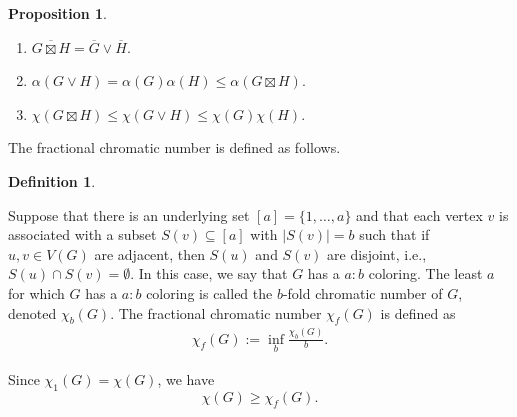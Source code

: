\documentclass[journal, onecolumn, draftcls]{IEEEtran}
\theoremstyle{definition}
\newtheorem{proposition}{Proposition}
\newtheorem{definition}{Definition}
\newcommand{\aditya}[1]{\marginpar{+}{\bf Aditya's remark}: {\em #1}}
\begin{document}
\begin{proposition}\label{prop:chi}
\begin{enumerate} [label=(\alph*)]
    \item $\overline{G\boxtimes H} = \overline{G}\lor \overline{H}$.\label{prop:de_morgan}
    \item $\alpha(G\lor H)=\alpha(G)\alpha(H) \le \alpha(G\boxtimes H)$. \label{prop:alpha_AND_OR_product}
    \item $\chi(G\boxtimes H)\le \chi(G\lor H)\le \chi(G)\chi(H)$.\label{prop:chi_product}
\end{enumerate}
\end{proposition}
The fractional chromatic number is defined as follows\cite{ScheinermanU97FGT}.
\begin{definition}\label{defn:b-fold_coloring} %
%

Suppose that there is an underlying set $[a]=\{1,\dots, a\}$ and that each vertex $v$ is associated with a subset $S(v)\subseteq [a]$ with $|S(v)| = b$ such that if $u,v\in V(G)$ are adjacent, then $S(u)$ and $S(v)$ are disjoint, i.e., $S(u) \cap S(v) = \emptyset$. In this case, we say that $G$ has a $a:b$ coloring.
%
%
The least $a$ for which $G$ has a $a:b$ coloring is called the $b$-fold chromatic number of $G$, denoted $\chi_b(G)$. The fractional chromatic number $\chi_f(G)$ is defined as
\begin{align*}
    \chi_f(G):= \inf_b \frac{\chi_b(G)}{b}.
\end{align*}
\end{definition}
 Since $\chi_1(G) = \chi(G)$, we have 
\begin{equation}\label{eqn:chi>=chi_f}
    \chi(G) \ge \chi_f(G).
\end{equation}
\end{document}
